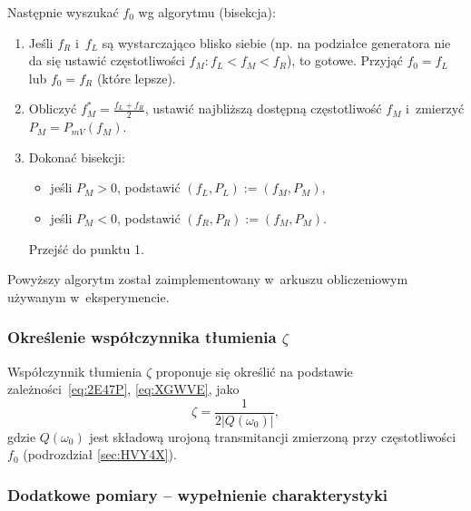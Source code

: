 \documentclass[paper=a4,DIV=12]{lpas}
\begin{document}
\begin{appendices}
  Następnie wyszukać $f_0$ wg algorytmu (bisekcja):
  \begin{enumerate}
    \item Jeśli $f_R$ i~$f_L$ są wystarczająco blisko siebie (np. na podziałce
      generatora nie da się ustawić częstotliwości $f_M: f_L < f_M < f_R$), to
      gotowe. Przyjąć $f_0 = f_L$ lub $f_0 = f_R$ (które lepsze).
    \item Obliczyć $f_M^{*} = \frac{f_L + f_R}{2}$, ustawić najbliższą dostępną
      częstotliwość $f_M$ i~zmierzyć $P_M = P_{mV}(f_M)$.
    \item Dokonać bisekcji:
      \begin{itemize}
        \item jeśli $P_M > 0$, podstawić $(f_L, P_L) := (f_M, P_M)$,
        \item jeśli $P_M < 0$, podstawić $(f_R, P_R) := (f_M, P_M)$.
      \end{itemize}
      Przejść do punktu 1.
  \end{enumerate}
  Powyższy algorytm został zaimplementowany w~arkuszu obliczeniowym używanym
  w~eksperymencie.

  \subsubsection{Określenie współczynnika tłumienia $\zeta$}
  \label{sec:L7DED}

  Współczynnik tłumienia $\zeta$ proponuje się określić na podstawie
  zależności~\eqref{eq:2E47P}, \eqref{eq:XGWVE}, jako
  \begin{equation}
    \zeta = \frac{1}{2 |Q(\omega_0)|},
    \label{eq:G616R}
  \end{equation}
  gdzie $Q(\omega_0)$ jest składową urojoną transmitancji zmierzoną przy
  częstotliwości $f_0$ (podrozdział \ref{sec:HVY4X}).

  \subsubsection{Dodatkowe pomiary -- wypełnienie charakterystyki}
  \label{sec:X9JYP}


\end{appendices}
\end{document}
